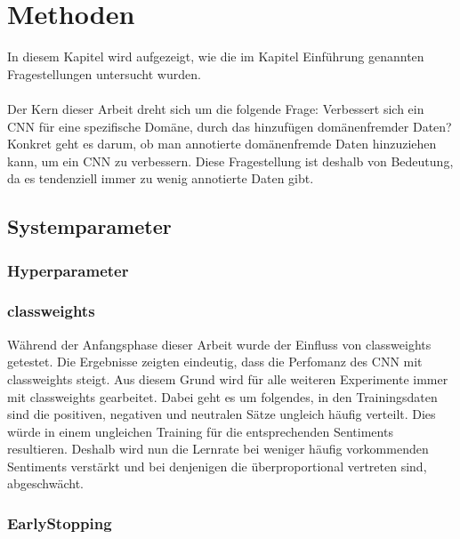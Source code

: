 \chapter{Methoden}
\label{methods}
In diesem Kapitel wird aufgezeigt, wie die im Kapitel Einführung genannten Fragestellungen untersucht wurden.\\\\
Der Kern dieser Arbeit dreht sich um die folgende Frage: Verbessert sich ein CNN für eine spezifische Domäne, durch das hinzufügen domänenfremder Daten?
Konkret geht es darum, ob man annotierte domänenfremde Daten hinzuziehen kann, um ein CNN zu verbessern. Diese Fragestellung ist deshalb von Bedeutung, da es tendenziell immer zu wenig annotierte Daten gibt.
\section{Systemparameter}
\subsection{Hyperparameter}
\subsection{classweights}
Während der Anfangsphase dieser Arbeit wurde der Einfluss von classweights getestet. Die Ergebnisse zeigten eindeutig, dass die Perfomanz des CNN mit classweights steigt. Aus diesem Grund wird für alle weiteren Experimente immer mit classweights gearbeitet.
Dabei geht es um folgendes, in den Trainingsdaten sind die positiven, negativen und neutralen Sätze ungleich häufig verteilt. Dies würde in einem ungleichen Training für die entsprechenden Sentiments resultieren. Deshalb wird nun die Lernrate bei weniger häufig vorkommenden Sentiments verstärkt und bei denjenigen die überproportional vertreten sind, abgeschwächt.
\subsection{EarlyStopping}
